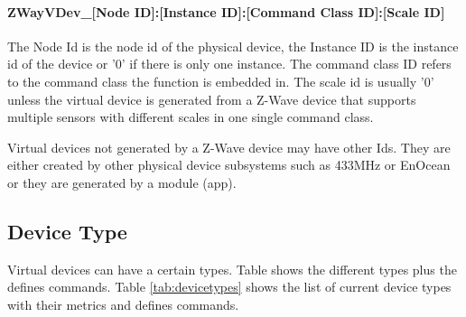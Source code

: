 \paragraph{ZWayVDev\_[Node ID]:[Instance ID]:[Command Class ID]:[Scale ID]}

The Node Id is the node id of the physical device, the Instance ID is the instance id 
of the device  or '0' if there is only one instance. The command class ID refers to the 
command class the function is embedded in. The scale id is usually '0' unless the virtual
device is generated from a Z-Wave device that supports multiple sensors with different 
scales in one single command class.

Virtual devices not generated by a Z-Wave device may have other Ids. They are either created 
by other physical device subsystems such as 433MHz or EnOcean or they are generated
by a module (app).

\subsection{Device Type}

Virtual devices can have a certain types. Table shows the different types plus the defines 
commands.  Table \ref{tab:devicetypes} shows the list of current device types with their 
metrics and defines commands.

